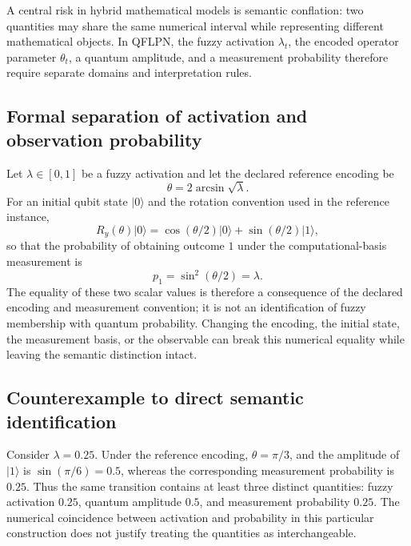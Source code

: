 \documentclass[final,3p,times]{elsarticle}
\begin{document}
A central risk in hybrid mathematical models is semantic conflation: two quantities may share the same numerical interval while representing different mathematical objects. In QFLPN, the fuzzy activation $\lambda_t$, the encoded operator parameter $\theta_t$, a quantum amplitude, and a measurement probability therefore require separate domains and interpretation rules.

\subsection{Formal separation of activation and observation probability}

Let $\lambda\in[0,1]$ be a fuzzy activation and let the declared reference encoding be
\begin{equation}
    \theta = 2\arcsin\sqrt{\lambda}.
\end{equation}
For an initial qubit state $|0\rangle$ and the rotation convention used in the reference instance,
\begin{equation}
    R_y(\theta)|0\rangle
    = \cos(\theta/2)|0\rangle
    + \sin(\theta/2)|1\rangle,
\end{equation}
so that the probability of obtaining outcome $1$ under the computational-basis measurement is
\begin{equation}
    p_1 = \sin^2(\theta/2)=\lambda.
\end{equation}
The equality of these two scalar values is therefore a consequence of the declared encoding and measurement convention; it is not an identification of fuzzy membership with quantum probability. Changing the encoding, the initial state, the measurement basis, or the observable can break this numerical equality while leaving the semantic distinction intact.

\subsection{Counterexample to direct semantic identification}

Consider $\lambda=0.25$. Under the reference encoding, $\theta=\pi/3$, and the amplitude of $|1\rangle$ is $\sin(\pi/6)=0.5$, whereas the corresponding measurement probability is $0.25$. Thus the same transition contains at least three distinct quantities: fuzzy activation $0.25$, quantum amplitude $0.5$, and measurement probability $0.25$. The numerical coincidence between activation and probability in this particular construction does not justify treating the quantities as interchangeable.
\end{document}
